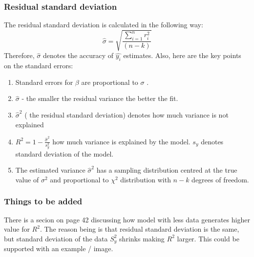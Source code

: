 \documentclass{article}
\begin{document}
\subsubsection*{Residual standard deviation}
The residual standard deviation is calculated in the following way:
\begin{equation}
\hat{\sigma} = \sqrt{\frac{\sum_{i=1}^{n}r_{i}^2}{(n-k)}}
\end{equation}
\indent
Therefore,  $\hat{\sigma}$ denotes the accuracy of $\hat{y_i}$ estimates.
Also, here are the key points on the standard errors:
\begin{enumerate}
\item Standard errors for $\beta$ are proportional to $\sigma$ .
\item $\hat{\sigma}$ - the smaller the residual variance the better the fit.
\item $\hat{\sigma}^2$ ( the residual standard deviation) denotes how much variance is not explained
\item $R^2 = 1 - \frac{\hat{\sigma}^2}{s_{y}^2}$ how much variance is explained by the model. $s_{y}$ denotes standard deviation of the model.
\item The estimated variance $\hat{\sigma}^2$ has a sampling distribution centred at the true value of $\sigma^2$ and proportional to $\chi^2$ distribution with $n-k$ degrees of freedom.

\end{enumerate}

\subsubsection*{Things to be added}
There is a secion on page 42 discussing how model with less data generates higher value for $R^2$. The reason being is that residual standard deviation is the same, but standard deviation of the data $S_{y}^2$ shrinks making $R^2$ larger. This could be supported with an example / image.
\end{document}
